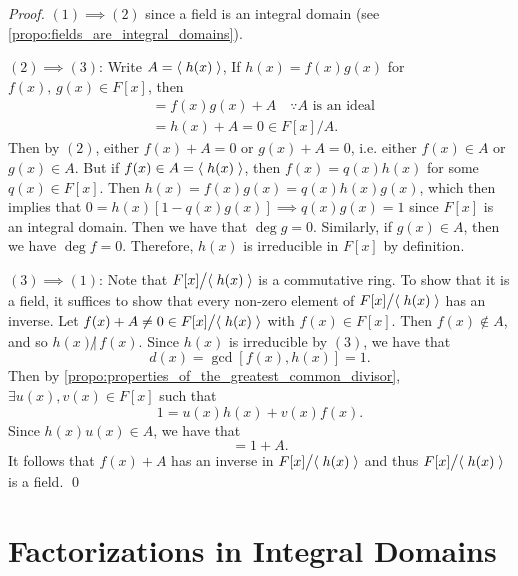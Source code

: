 \begin{proof}
  $(1) \implies (2)$ since a field is an integral domain (see \cref{propo:fields_are_integral_domains}).

  \noindent $(2) \implies (3)$: Write $A = \langle \; h(x) \; \rangle$, If $h(x) = f(x) g(x)$ for $f(x), \, g(x) \in F[x]$, then
  \begin{align*}
    [ f(x) + A ] [ g(x) + A ] &= f(x) g(x) + A \quad \because A \text{ is an ideal } \\
                              &= h(x) + A = 0 \in F[x] \big/ A.
  \end{align*}
  Then by $(2)$, either $f(x) + A = 0$ or $g(x) + A = 0$, i.e. either $f(x) \in A$ or $g(x) \in A$. But if $f(x) \in A = \langle \; h(x) \; \rangle$, then $f(x) = q(x) h(x)$ for some $q(x) \in F[x]$. Then $h(x) = f(x) g(x) = q(x) h(x) g(x)$, which then implies that $0 = h(x) [ 1 - q(x) g(x) ] \implies q(x) g(x) = 1$ since $F[x]$ is an integral domain. Then we have that $\deg g = 0$. Similarly, if $g(x) \in A$, then we have $\deg f = 0$. Therefore, $h(x)$ is irreducible in $F[x]$ by definition.

  \noindent $(3) \implies (1)$: Note that $F[x] \big/ \langle \; h(x) \; \rangle$ is a commutative ring. To show that it is a field, it suffices to show that every non-zero element of $F[x] \big/ \langle \; h(x) \; \rangle$ has an inverse. Let $f(x) + A \neq 0 \in F[x] \big/ \langle \; h(x) \; \rangle$ with $f(x) \in F[x]$. Then $f(x) \notin A$, and so $h(x) \not| \, f(x)$. Since $h(x)$ is irreducible by $(3)$, we have that
  \begin{equation*}
    d(x) = \gcd[ f(x), h(x) ] = 1.
  \end{equation*}
  Then by \cref{propo:properties_of_the_greatest_common_divisor}, $\exists u(x), v(x) \in F[x]$ such that
  \begin{equation*}
    1 = u(x) h(x) + v(x) f(x).
  \end{equation*}
  Since $h(x) u(x) \in A$, we have that
  \begin{equation*}
    [v(x) + A] [f(x) + A] = 1 + A.
  \end{equation*}
  It follows that $f(x) + A$ has an inverse in $F[x] \big/ \langle \; h(x) \; \rangle$ and thus $F[x] \big/ \langle \; h(x) \; \rangle$ is a field. \qed
\end{proof}



\section{Factorizations in Integral Domains}%
\label{sec:factorizations_in_integral_domains}

